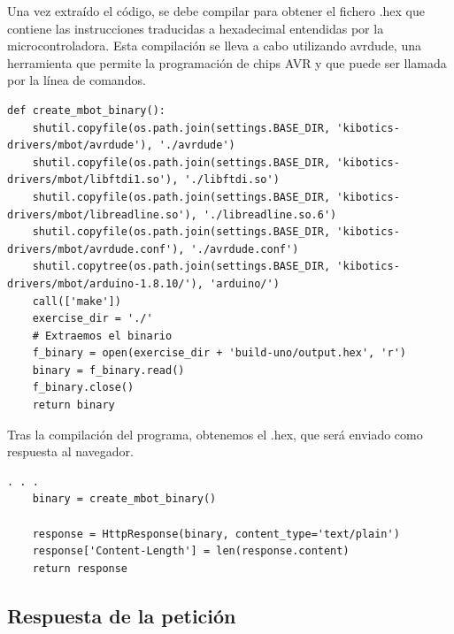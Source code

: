 \documentclass{report}
\begin{document}
Una vez extraído el código, se debe compilar para obtener el fichero .hex que contiene las instrucciones traducidas a hexadecimal entendidas por la microcontroladora. Esta compilación se lleva a cabo utilizando avrdude, una herramienta que permite la programación de chips AVR y que puede ser llamada por la línea de comandos.
\\
\begin{lstlisting}[frame=single,breaklines=true, label="Compilado y obtención del .hex", caption="Compilado y obtención del .hex", captionpos=b]
def create_mbot_binary():
    shutil.copyfile(os.path.join(settings.BASE_DIR, 'kibotics-drivers/mbot/avrdude'), './avrdude')
    shutil.copyfile(os.path.join(settings.BASE_DIR, 'kibotics-drivers/mbot/libftdi1.so'), './libftdi.so')
    shutil.copyfile(os.path.join(settings.BASE_DIR, 'kibotics-drivers/mbot/libreadline.so'), './libreadline.so.6')
    shutil.copyfile(os.path.join(settings.BASE_DIR, 'kibotics-drivers/mbot/avrdude.conf'), './avrdude.conf')
    shutil.copytree(os.path.join(settings.BASE_DIR, 'kibotics-drivers/mbot/arduino-1.8.10/'), 'arduino/')
    call(['make'])
    exercise_dir = './'
    # Extraemos el binario
    f_binary = open(exercise_dir + 'build-uno/output.hex', 'r')
    binary = f_binary.read()
    f_binary.close()
    return binary
\end{lstlisting}
Tras la compilación del programa, obtenemos el .hex, que será enviado como respuesta al navegador.
\\
\begin{lstlisting}[frame=single,breaklines=true, label="Respuesta a la peticion que envio el navegador", caption="Respuesta a la peticion que envio el navegador", captionpos=b]
    . . .
    binary = create_mbot_binary()

    response = HttpResponse(binary, content_type='text/plain')
    response['Content-Length'] = len(response.content)
    return response
\end{lstlisting}

\subsection{Respuesta de la petición}
\end{document}
